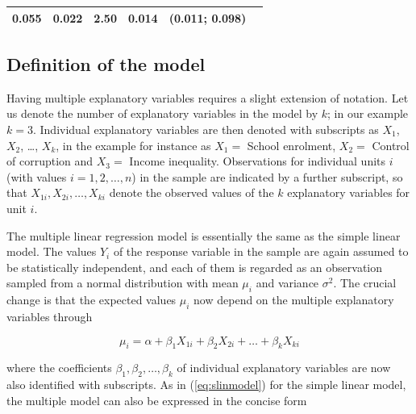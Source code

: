\documentclass[11pt,a4paper,openany]{book}
\begin{document}
\begin{longtable}[]{@{}lrrrrc@{}}
\begin{minipage}[t]{0.08\columnwidth}
0.055\strut
\end{minipage} & \begin{minipage}[t]{0.06\columnwidth}\raggedleft\strut
0.022\strut
\end{minipage} & \begin{minipage}[t]{0.05\columnwidth}\raggedleft\strut
2.50\strut
\end{minipage} & \begin{minipage}[t]{0.07\columnwidth}\raggedleft\strut
0.014\strut
\end{minipage} & \begin{minipage}[t]{0.11\columnwidth}\centering\strut
(0.011; 0.098)\strut
\end{minipage}\tabularnewline
\bottomrule
\end{longtable}

\subsection{Definition of the model}\label{ss-regression-multiple-def}

Having multiple explanatory variables requires a slight extension of
notation. Let us denote the number of explanatory variables in the model
by \(k\); in our example \(k=3\). Individual explanatory variables are
then denoted with subscripts as \(X_{1}\), \(X_{2}\), \ldots{},
\(X_{k}\), in the example for instance as \(X_{1}=\) School enrolment,
\(X_{2}=\) Control of corruption and \(X_{3}=\) Income inequality.
Observations for individual units \(i\) (with values \(i=1,2,\dots,n\))
in the sample are indicated by a further subscript, so that
\(X_{1i}, X_{2i}, \dots, X_{ki}\) denote the observed values of the
\(k\) explanatory variables for unit \(i\).

The multiple linear regression model is essentially the same as the
simple linear model. The values \(Y_{i}\) of the response variable in
the sample are again assumed to be statistically independent, and each
of them is regarded as an observation sampled from a normal distribution
with mean \(\mu_{i}\) and variance \(\sigma^{2}\). The crucial change is
that the expected values \(\mu_{i}\) now depend on the multiple
explanatory variables through

\begin{equation}\mu_{i} = \alpha +\beta_{1}X_{1i}+\beta_{2}X_{2i}+\dots+\beta_{k}X_{ki}
\label{eq:mu-multiple}\end{equation}

where the coefficients \(\beta_{1}, \beta_{2}, \dots, \beta_{k}\) of
individual explanatory variables are now also identified with
subscripts. As in (\ref{eq:slinmodel}) for the simple linear model, the
multiple model can also be expressed in the concise form
\end{document}
